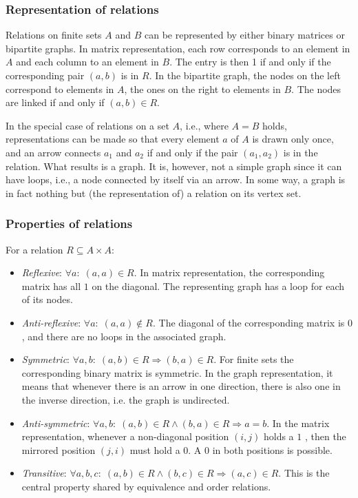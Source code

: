 \subsubsection{Representation of relations}\label{subsubsec:relation-representation}

Relations on finite sets \(A\) and \(B\) can be represented by either binary matrices or bipartite graphs.
In matrix representation, each row corresponds to an element in $A$ and each column to an element in $B$. The entry is then 1 if and only if the corresponding pair $(a, b)$ is in $R$.
In the bipartite graph, the nodes on the left correspond to elements in $A$, the ones on the right to elements in $B$. The nodes are linked if and only if $(a, b) \in R$.

In the special case of relations on a set $A$, i.e., where $A=B$ holds, representations can be made so that every element $a$ of $A$ is drawn only once, and an arrow connects $a_1$ and $a_2$ if and only if the pair $(a_1, a_2)$ is in the relation. 
What results is a graph. 
It is, however, not a simple graph since it can have loops, i.e., a node connected by itself via an arrow. 
In some way, a graph is in fact nothing but (the representation of) a relation on its vertex set.





\subsubsection{Properties of relations}\label{subsubsec:relation-properties}

For a relation \(R\subseteq A\times A\):
\begin{itemize}[leftmargin=2em]
\item \emph{Reflexive}: \(\forall a: \;(a,a)\in R\).
In matrix representation, the corresponding matrix has all \(1\) on the diagonal.
The representing graph has a loop for each of its nodes.
\item \emph{Anti-reflexive}: \(\forall a: \;(a,a)\notin R\).
The diagonal of the corresponding matrix is \(0\), and there are no loops in the associated graph.
\item \emph{Symmetric}: \(\forall a,b: \;(a,b)\in R\Rightarrow(b,a)\in R\).
For ﬁnite sets the corresponding binary matrix is symmetric. 
In the graph representation, it means that whenever there is an arrow in one direction, there is also one in the inverse direction, i.e. the graph is undirected.
\item \emph{Anti-symmetric}: \(\forall a, b: \;(a,b)\in R\wedge(b,a)\in R\Rightarrow a=b\).
In the matrix representation, whenever a non-diagonal position $(i, j)$ holds a $1$ , then the mirrored position $(j, i)$ must hold a $0$. 
A $0$ in both positions is possible.
\item \emph{Transitive}: \(\forall a,b,c: \;(a,b)\in R\wedge(b,c)\in R\Rightarrow(a,c)\in R\).
This is the central property shared by equivalence and order relations.
\end{itemize}

